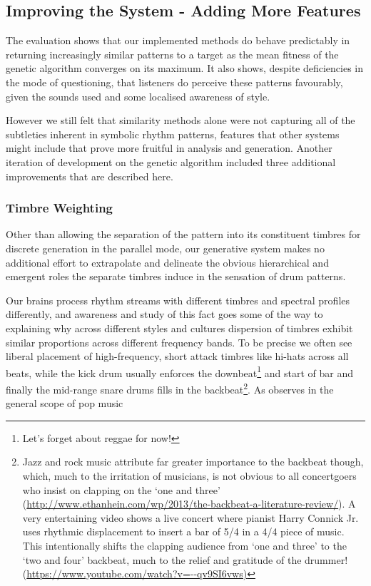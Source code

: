 {{{\subsection{Improving the System - Adding More Features}

The evaluation shows that our implemented methods do behave predictably in returning increasingly similar patterns to a target as the mean fitness of the genetic algorithm converges on its maximum. It also shows, despite deficiencies in the mode of questioning, that listeners do perceive these patterns favourably, given the sounds used and some localised awareness of style.

However we still felt that similarity methods alone were not capturing all of the subtleties inherent in symbolic rhythm patterns, features that other systems might include that prove more fruitful in analysis and generation. Another iteration of development on the genetic algorithm included three additional improvements that are described here.

\subsubsection{Timbre Weighting}

\label{sec:timbre_weighting}

Other than allowing the separation of the pattern into its constituent timbres for discrete generation in the parallel mode, our generative system makes no additional effort to extrapolate and delineate the obvious hierarchical and emergent roles the separate timbres induce in the sensation of drum patterns. 

Our brains process rhythm streams with different timbres and spectral profiles differently, and awareness and study of this fact goes some of the way to explaining why across different styles and cultures dispersion of timbres exhibit similar proportions across different frequency bands. To be precise we often see liberal placement of high-frequency, short attack timbres like hi-hats across all beats, while the kick drum usually enforces the downbeat\footnote{Let's forget about reggae for now!} and start of bar and finally the mid-range snare drums fills in the backbeat\footnote{Jazz and rock music attribute far greater importance to the backbeat though, which, much to the irritation of musicians, is not obvious to all concertgoers who insist on clapping on the `one and three' (\url{http://www.ethanhein.com/wp/2013/the-backbeat-a-literature-review/}). A very entertaining video shows a live concert where pianist Harry Connick Jr. uses rhythmic displacement to insert a bar of 5/4 in a 4/4 piece of music. This intentionally shifts the clapping audience from `one and three' to the `two and four' backbeat, much to the relief and gratitude of the drummer! (\url{https://www.youtube.com/watch?v=--qv9SI6vws)}}. As \cite{Merchant2015} observes in the general scope of pop music 

}}}
